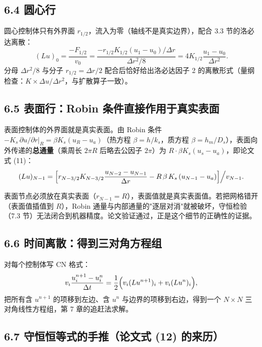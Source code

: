 \documentclass[12pt,a4paper]{ctexart}
\newcommand{\why}[1]{\par\smallskip\noindent{\heiti 【为什么要这样做】}#1\par\smallskip}
\begin{document}
\subsection{6.4 圆心行}

圆心控制体只有外界面 $r_{1/2}$，流入为零（轴线不是真实边界），配合 3.3 节的洛必达离散：
\begin{equation}
(Lu)_0=\frac{-F_{1/2}}{v_0}
=\frac{-r_{1/2}K_{1/2}(u_1-u_0)/\Delta r}{\Delta r^2/8}
=4K_{1/2}\frac{u_1-u_0}{\Delta r^2}.
\end{equation}
分母 $\Delta r^2/8$ 与分子 $r_{1/2}=\Delta r/2$ 配合后恰好给出洛必达因子 2 的离散形式（量纲检查：$K\times\Delta u/\Delta r^2$，与扩散算子一致）。

\subsection{6.5 表面行：Robin 条件直接作用于真实表面}

表面控制体的外界面就是真实表面。由 Robin 条件 $-K_s\,\partial u/\partial r|_R=\beta K_s(u_R-u_a)$（热方程 $\beta=h/k_s$，质方程 $\beta=h_m/D_s$），表面向外传递的\textbf{总通量}（乘周长 $2\pi R$ 后略去公因子 $2\pi$）为 $R\cdot\beta K_s(u_s-u_a)$，即论文式 (11)：
\begin{equation}
(Lu)_{N-1}=\Bigl[r_{N-3/2}K_{N-3/2}\frac{u_{N-2}-u_{N-1}}{\Delta r}
-R\,\beta\,K_s\,(u_{N-1}-u_a)\Bigr]\Big/v_{N-1}.
\end{equation}

\why{表面节点必须放在真实表面（$r_{N-1}=R$），表面值就是真实表面值。若把网格错开（表面值插值到 $R$），Robin 通量与内部通量的"逐层对消"就被破坏，守恒检验（7.3 节）无法闭合到机器精度。论文验证通过，正是这个细节的正确性的证据。}

\subsection{6.6 时间离散：得到三对角方程组}

对每个控制体写 CN 格式：
\begin{equation}
v_i\frac{u_i^{n+1}-u_i^n}{\Delta t}
=\frac12\Bigl(v_i(Lu^{n+1})_i+v_i(Lu^n)_i\Bigr),
\end{equation}
把所有含 $u^{n+1}$ 的项移到左边、含 $u^n$ 与边界的项移到右边，得到一个 $N\times N$ 三对角线性方程组，第 7 章的追赶法求解。

\subsection{6.7 守恒恒等式的手推（论文式 (12) 的来历）}
\end{document}
